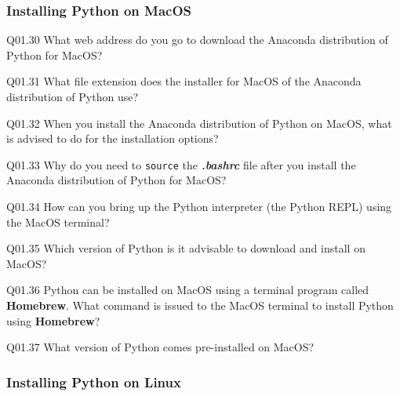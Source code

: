 \documentclass{book}
\newenvironment{problems}{}{}  %
\newcommand{\passthrough}[1]{#1}
\begin{document}
    




    
        \hypertarget{installing-python-on-macos}{%
\subsubsection{Installing Python on
MacOS}\label{installing-python-on-macos}}
    




    
        \begin{problems}
        Q01.30 What web address do you go to download the Anaconda distribution
of Python for MacOS?

Q01.31 What file extension does the installer for MacOS of the Anaconda
distribution of Python use?

Q01.32 When you install the Anaconda distribution of Python on MacOS,
what is advised to do for the installation options?

Q01.33 Why do you need to \passthrough{\lstinline!source!} the
\textbf{\emph{.bashrc}} file after you install the Anaconda distribution
of Python for MacOS?

Q01.34 How can you bring up the Python interpreter (the Python REPL)
using the MacOS terminal?

Q01.35 Which version of Python is it advisable to download and install
on MacOS?

Q01.36 Python can be installed on MacOS using a terminal program called
\textbf{Homebrew}. What command is issued to the MacOS terminal to
install Python using \textbf{Homebrew}?

Q01.37 What version of Python comes pre-installed on MacOS?
        \end{problems}

    




    
        \hypertarget{installing-python-on-linux}{%
\subsubsection{Installing Python on
Linux}\label{installing-python-on-linux}}
    
\end{document}
